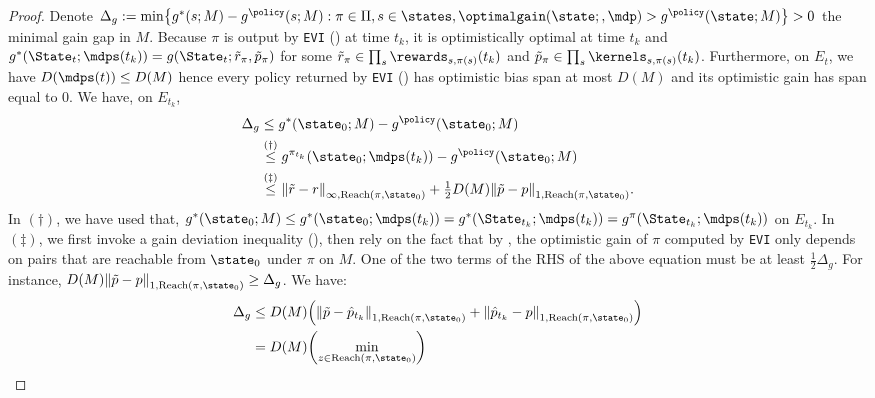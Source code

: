 \documentclass[preprint,cleveref,12pt]{colt2025}
\DeclarePairedDelimiter{\braces}{\{}{\}}	%
\DeclarePairedDelimiter{\parens}{(}{)}	%
\DeclarePairedDelimiter{\norm}{\lVert}{\rVert}	%
\def\model{\mdp}
\def\models{\mdps}
\def\optgain{\optimalgain} %
\def\Reach{\mathrm{Reach}}
\begin{document}
\begin{proof}
        Denote $\Delta_g := \min \braces*{g^*(s; M) - g^\policy(s; M) : \pi \in \Pi, s \in \states, \optgain(\state;, \model) > g^\policy(\state; M)} > 0$ the minimal gain gap in $M$.
        Because $\pi$ is output by \texttt{EVI} () at time $t_k$, it is optimistically optimal at time $t_k$ and $g^*(\State_t; \models(t_k)) = g(\State_t; \tilde{r}_\pi, \tilde{p}_\pi)$ for some $\tilde{r}_\pi \in \prod_s \rewards_{s, \pi(s)}(t_k)$ and $\tilde{p}_\pi \in \prod_s \kernels_{s, \pi(s)}(t_k)$.
        Furthermore, on $E_t$, we have $D(\models(t)) \le D(M)$ hence every policy returned by \texttt{EVI} () has optimistic bias span at most $D(M)$ and its optimistic gain has span equal to $0$.
        We have, on $E_{t_k}$,
        \begin{align*}
            \Delta_g
            & \le g^*(\state_0; M) - g^\policy(\state_0; M)
            \\
            & \overset{(\dagger)}\le 
            g^{\pi_{t_k}}(\state_0; \models(t_k)) - g^\policy(\state_0; M)
            \\
            & \overset{(\ddagger)}\le 
            \norm*{\tilde{r} - r}_{\infty, \Reach(\pi, \state_0)}
            + \tfrac 12 D(M) \norm*{\tilde{p} - p}_{1, \Reach(\pi, \state_0)}
            .
        \end{align*}
        In $(\dagger)$, we have used that, $g^*(\state_0; M) \le g^*(\state_0; \models(t_k)) = g^*(\State_{t_k}; \models(t_k)) = g^\pi(\State_{t_k}; \models(t_k))$ on $E_{t_k}$.
        In $(\ddagger)$, we first invoke a gain deviation inequality (), then rely on the fact that by , the optimistic gain of $\pi$ computed by \texttt{EVI} only depends on pairs that are reachable from $\state_0$ under $\pi$ on $M$.
        One of the two terms of the RHS of the above equation must be at least $\tfrac 12 \Delta_g$.
        For instance, $D(M) \norm*{\tilde{p} - p}_{1, \Reach(\pi, \state_0)} \ge \Delta_g$.
        We have:
        \begin{equation}
        \label{equation_asymptotic_2}
        \begin{split}
            \Delta_g
            & \le
            D(M) \parens*{
                \norm*{\tilde{p} - \hat{p}_{t_k}}_{1, \Reach(\pi, \state_0)}
                +
                \norm*{\hat{p}_{t_k} - p}_{1, \Reach(\pi, \state_0)}
            }
            \\
            & =
            D(M) \parens*{
                \min_{z \in \Reach(\pi, \state_0)}
}
\end{split}
\end{equation}
\end{proof}
\end{document}
